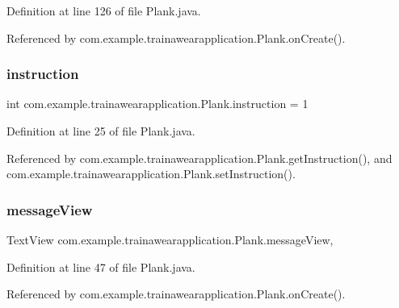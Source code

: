 Definition at line 126 of file Plank.\+java.



Referenced by com.\+example.\+trainawearapplication.\+Plank.\+on\+Create().

\mbox{\label{classcom_1_1example_1_1trainawearapplication_1_1_plank_a78c9024e55b5817aa05befcff69394c3}} 
\subsubsection{\texorpdfstring{instruction}{instruction}}
{\footnotesize\ttfamily int com.\+example.\+trainawearapplication.\+Plank.\+instruction = 1\hspace{0.3cm}{\ttfamily [static]}}



Definition at line 25 of file Plank.\+java.



Referenced by com.\+example.\+trainawearapplication.\+Plank.\+get\+Instruction(), and com.\+example.\+trainawearapplication.\+Plank.\+set\+Instruction().

\mbox{\label{classcom_1_1example_1_1trainawearapplication_1_1_plank_a0170d0db61f91fcda18f59d7c6dc626a}} 
\subsubsection{\texorpdfstring{messageView}{messageView}}
{\footnotesize\ttfamily Text\+View com.\+example.\+trainawearapplication.\+Plank.\+message\+View\hspace{0.3cm}{\ttfamily [static]}, {\ttfamily [package]}}



Definition at line 47 of file Plank.\+java.



Referenced by com.\+example.\+trainawearapplication.\+Plank.\+on\+Create().

